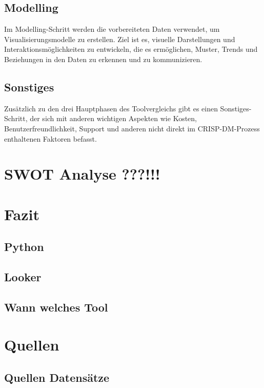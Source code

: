 \documentclass[12pt]{article}
\begin{document}
	
	
	\subsection{Modelling}
	Im Modelling-Schritt werden die vorbereiteten Daten verwendet, um Visualisierungsmodelle zu erstellen. Ziel ist es, visuelle Darstellungen und Interaktionsmöglichkeiten zu entwickeln, die es ermöglichen, Muster, Trends und Beziehungen in den Daten zu erkennen und zu kommunizieren.
	
	
	
	\subsection{Sonstiges}
	Zusätzlich zu den drei Hauptphasen des Toolvergleichs gibt es einen Sonstiges-Schritt, der sich mit anderen wichtigen Aspekten wie Kosten, Benutzerfreundlichkeit, Support und anderen nicht direkt im CRISP-DM-Prozess enthaltenen Faktoren befasst.
	
	
	
	\section{SWOT Analyse ???!!!}
	
	\section{Fazit}
	
	\subsection{Python}

	\subsection{Looker}

	\subsection{Wann welches Tool}
	
	\section{Quellen}
	
	\subsection{Quellen Datensätze}
	
\end{document}
